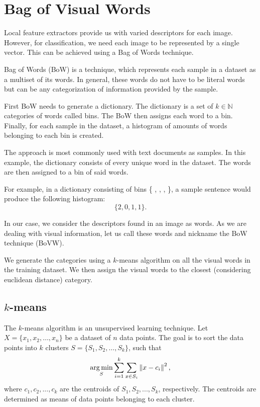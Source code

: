 \section{Bag of Visual Words}
Local feature extractors provide us with varied descriptors for each image. However, for classification, we need each image to be represented by a single vector. This can be achieved using a Bag of Words technique.

Bag of Words (BoW) is a technique, which represents each sample in a dataset as a multiset of its words. In general, these words do not have to be literal words but can be any categorization of information provided by the sample.

First BoW needs to generate a dictionary. The dictionary is a set of $k \in \mathbb{N}$ categories of words called bins. The BoW then assigns each word to a bin. Finally, for each sample in the dataset, a histogram of amounts of words belonging to each bin is created.

The approach is most commonly used with text documents as samples. In this example, the dictionary consists of every unique word in the dataset. The words are then assigned to a bin of said words.

For example, in a dictionary consisting of bins \{ , , ,  \}, a sample sentence  would produce the following histogram:
\begin{equation}
    \{2, 0, 1, 1\}.
\end{equation}

In our case, we consider the descriptors found in an image as words. As we are dealing with visual information, let us call these words  and nickname the BoW technique  (BoVW).

We generate the categories using a $k$-means algorithm on all the visual words in the training dataset. We then assign the visual words to the closest (considering euclidean distance) category.

\subsection{$k$-means}
The $k$-means algorithm is an unsupervised learning technique. Let $X=\{ x_1, x_2, \dots, x_n \}$ be a dataset of $n$ data points. The goal is to sort the data points into $k$ clusters $S = \{ S_1, S_2, \dots, S_k \}$, such that
\begin{equation}
    \operatorname*{arg\,min}_S \sum_{i=1}^k \sum_{x\in S_i} \left\lVert x-c_i\right\rVert^2,
\end{equation}
where \(c_1, c_2, ..., c_k \) are the centroids of \(S_1, S_2, ..., S_k \), respectively. The centroids are determined as means of data points belonging to each cluster.

